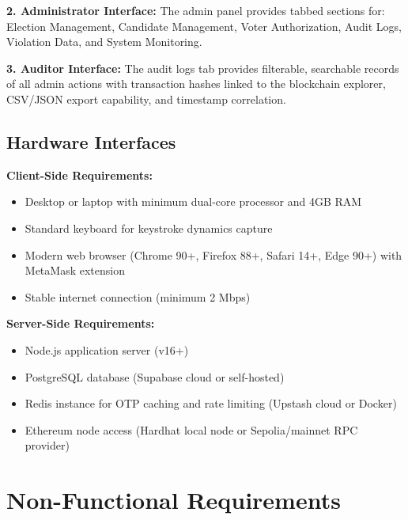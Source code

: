 \documentclass[oneside,a4paper,12pt]{book}
\begin{document}
\textbf{2. Administrator Interface:} The admin panel provides tabbed sections for: Election Management, Candidate Management, Voter Authorization, Audit Logs, Violation Data, and System Monitoring.

\textbf{3. Auditor Interface:} The audit logs tab provides filterable, searchable records of all admin actions with transaction hashes linked to the blockchain explorer, CSV/JSON export capability, and timestamp correlation.

\subsection{Hardware Interfaces}

\textbf{Client-Side Requirements:}
\begin{itemize}[leftmargin=1.5cm]
    \item Desktop or laptop with minimum dual-core processor and 4GB RAM
    \item Standard keyboard for keystroke dynamics capture
    \item Modern web browser (Chrome 90+, Firefox 88+, Safari 14+, Edge 90+) with MetaMask extension
    \item Stable internet connection (minimum 2 Mbps)
\end{itemize}

\textbf{Server-Side Requirements:}
\begin{itemize}[leftmargin=1.5cm]
    \item Node.js application server (v16+)
    \item PostgreSQL database (Supabase cloud or self-hosted)
    \item Redis instance for OTP caching and rate limiting (Upstash cloud or Docker)
    \item Ethereum node access (Hardhat local node or Sepolia/mainnet RPC provider)
\end{itemize}

\section{Non-Functional Requirements}
\end{document}
